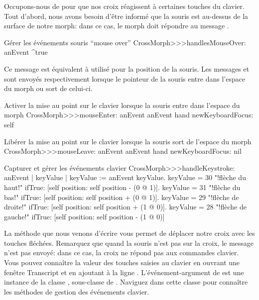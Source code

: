 \documentclass[a4paper,10pt,twoside]{book}
\begin{document}
Occupons-nous de  pour que nos croix réagissent \`a
certaines touches du clavier. Tout d'abord, nous avons besoin d'être
informé que la souris est au-dessus de la surface de notre morph:
dans ce cas, le morph doit répondre  au message
.


\begin{method}{Gérer les événements souris ``mouse over''} 
CrossMorph>>>handlesMouseOver: anEvent
	^true
\end{method}

\noindent
Ce message est équivalent \`a 
utilisé pour la position de la souris.
Les messages  et
 sont envoyés respectivement lorsque le
pointeur de la souris entre dans l'espace du morph ou sort de celui-ci.

\begin{method}{Activer la mise au point sur le clavier lorsque la souris entre dans l'espace du morph}
CrossMorph>>>mouseEnter: anEvent
	anEvent hand newKeyboardFocus: self
\end{method}

\begin{method}{Libérer la mise au point sur le clavier lorsque la souris sort de l'espace du morph}
CrossMorph>>>mouseLeave: anEvent
	anEvent hand newKeyboardFocus: nil
\end{method}

\begin{method}[handleKeystroke]{Capturer et gérer les événements clavier}
CrossMorph>>>handleKeystroke: anEvent
	| keyValue |
	keyValue := anEvent keyValue.
	keyValue = 30	 "!flèche du haut!"
		ifTrue: [self position: self position - (0 @ 1)].
	keyValue = 31	 "!flèche du bas!"
		ifTrue: [self position: self position + (0 @ 1)].
	keyValue = 29	 "!flèche de droite!"
		ifTrue: [self position: self position + (1 @ 0)].
	keyValue = 28	 "!flèche de gauche!"
		ifTrue: [self position: self position - (1 @ 0)]
\end{method}

La méthode que nous venons d'écrire vous permet de déplacer
notre croix avec les touches fléchées. Remarquez que quand la
souris n'est pas sur la croix, le message
 n'est pas envoyé: dans ce cas, la croix
ne répond pas aux commandes clavier.
Vous pouvez connaître la valeur des touches saisies au clavier en
ouvrant une fenêtre Transcript et en ajoutant \`a 
 la ligne 
 .
L'événement-argument  de  est une
instance de la classe , sous-classe de
. Naviguez dans cette classe pour connaître les
méthodes de gestion des événements clavier.
\end{document}
